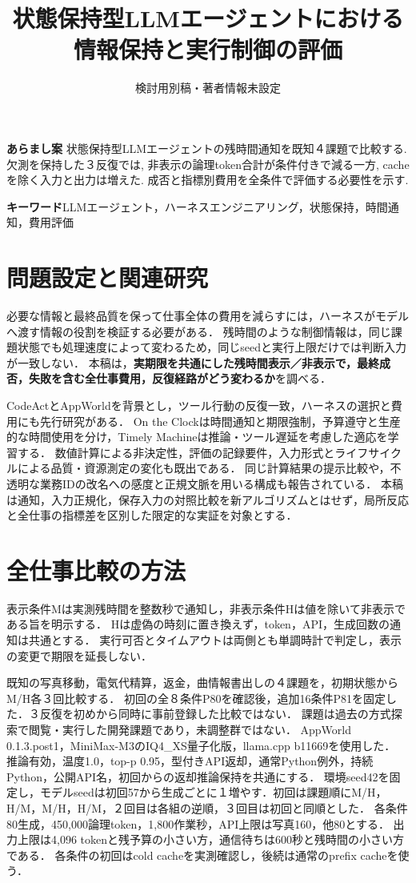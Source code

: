 \documentclass[uplatex,a4paper,twocolumn,10pt]{jsarticle}
\title{状態保持型LLMエージェントにおける\newline 情報保持と実行制御の評価}
\author{検討用別稿・著者情報未設定}
\date{}
\begin{document}
\raggedbottom
\maketitle
\noindent\textbf{あらまし案}\quad
状態保持型LLMエージェントの残時間通知を既知４課題で比較する. 欠測を保持した３反復では, 非表示の論理token合計が条件付きで減る一方, cacheを除く入力と出力は増えた. 成否と指標別費用を全条件で評価する必要性を示す.

\noindent\textbf{キーワード}\quad LLMエージェント，ハーネスエンジニアリング，状態保持，時間通知，費用評価

\section{問題設定と関連研究}
必要な情報と最終品質を保って仕事全体の費用を減らすには，ハーネスがモデルへ渡す情報の役割を検証する必要がある．
残時間のような制御情報は，同じ課題状態でも処理速度によって変わるため，同じseedと実行上限だけでは判断入力が一致しない．
本稿は，\textbf{実期限を共通にした残時間表示／非表示で，最終成否，失敗を含む全仕事費用，反復経路がどう変わるか}を調べる．

CodeAct\cite{codeact}とAppWorld\cite{appworld}を背景とし，ツール行動の反復一致\cite{consistency}，ハーネスの選択と費用\cite{beyondprompts}にも先行研究がある．
On the Clock\cite{clock}は時間通知と期限強制，予算遵守と生産的な時間使用を分け，Timely Machine\cite{timely}は推論・ツール遅延を考慮した適応を学習する．
数値計算による非決定性\cite{nondeterminism}，評価の記録要件\cite{repro}，入力形式とライフサイクルによる品質・資源測定の変化\cite{localprotocol}も既出である．
同じ計算結果の提示比較\cite{delivery}や，不透明な業務IDの改名への感度と正規文脈を用いる構成\cite{canonical}も報告されている．
本稿は通知，入力正規化，保存入力の対照比較を新アルゴリズムとはせず，局所反応と全仕事の指標差を区別した限定的な実証を対象とする．

\section{全仕事比較の方法}
表示条件Mは実測残時間を整数秒で通知し，非表示条件Hは値を除いて非表示である旨を明示する．
Hは虚偽の時刻に置き換えず，token，API，生成回数の通知は共通とする．
実行可否とタイムアウトは両側とも単調時計で判定し，表示の変更で期限を延長しない．

既知の写真移動，電気代精算，返金，曲情報書出しの４課題を，初期状態からM/H各３回比較する．
初回の全８条件P80を確認後，追加16条件P81を固定した．３反復を初めから同時に事前登録した比較ではない．
課題は過去の方式探索で閲覧・実行した開発課題であり，未調整群ではない．
AppWorld 0.1.3.post1，MiniMax-M3のIQ4\_XS量子化版，llama.cpp b11669を使用した．
推論有効，温度1.0，top-p 0.95，型付きAPI返却，通常Python例外，持続Python，公開API名，初回からの返却推論保持を共通にする．
環境seed42を固定し，モデルseedは初回57から生成ごとに１増やす．初回は課題順にM/H，H/M，M/H，H/M，２回目は各組の逆順，３回目は初回と同順とした．
各条件80生成，450,000論理token，1,800作業秒，API上限は写真160，他80とする．
出力上限は4,096 tokenと残予算の小さい方，通信待ちは600秒と残時間の小さい方である．
各条件の初回はcold cacheを実測確認し，後続は通常のprefix cacheを使う．
\end{document}
